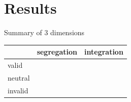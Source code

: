 \section{Results}

 \frame{\sectionpage}

    \begin{frame}{Summary of 3 dimensions}
        \begin{table}[h!]
            \footnotesize
            \begin{center}
              \label{tab:3D}
              \begin{tabular}{lcc}
                
                & segregation & integration  \\
                \hline
                valid & & \\
                neutral & & \\
                invalid & &
              \end{tabular}
            \end{center}
          \end{table}
    \end{frame}
    
